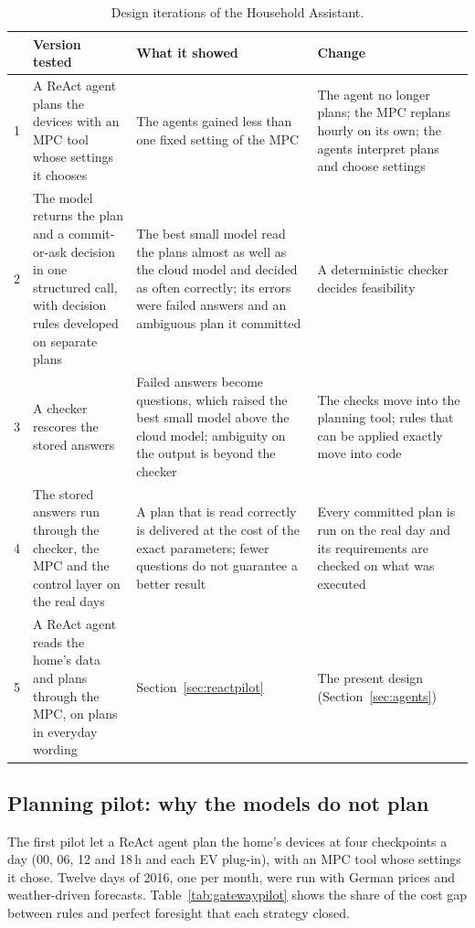 \documentclass[12pt,a4paper]{report}
\begin{document}
\begin{table}[htbp]
\caption{Design iterations of the Household Assistant.}
\label{tab:iterations}
\small
\begin{tabularx}{\textwidth}{@{}c>{\raggedright\arraybackslash}p{3.4cm}>{\raggedright\arraybackslash}X>{\raggedright\arraybackslash}X@{}}
\toprule
 & Version tested & What it showed & Change \\
\midrule
1 & A ReAct agent plans the devices with an MPC tool whose settings it chooses & The agents gained less than one fixed setting of the MPC & The agent no longer plans; the MPC replans hourly on its own; the agents interpret plans and choose settings \\[3pt]
2 & The model returns the plan and a commit-or-ask decision in one structured call, with decision rules developed on separate plans & The best small model read the plans almost as well as the cloud model and decided as often correctly; its errors were failed answers and an ambiguous plan it committed & A deterministic checker decides feasibility \\[3pt]
3 & A checker rescores the stored answers & Failed answers become questions, which raised the best small model above the cloud model; ambiguity on the output is beyond the checker & The checks move into the planning tool; rules that can be applied exactly move into code \\[3pt]
4 & The stored answers run through the checker, the MPC and the control layer on the real days & A plan that is read correctly is delivered at the cost of the exact parameters; fewer questions do not guarantee a better result & Every committed plan is run on the real day and its requirements are checked on what was executed \\[3pt]
5 & A ReAct agent reads the home's data and plans through the MPC, on plans in everyday wording & Section~\ref{sec:reactpilot} & The present design (Section~\ref{sec:agents}) \\
\bottomrule
\end{tabularx}
\end{table}

\subsection{Planning pilot: why the models do not plan}
\label{sec:gatewaypilot}

The first pilot let a ReAct agent plan the home's devices at four
checkpoints a day (00, 06, 12 and 18\,h and each EV plug-in), with an MPC tool whose
settings it chose. Twelve days of 2016, one per month, were run with
German prices and weather-driven forecasts. Table~\ref{tab:gatewaypilot}
shows the share of the cost gap between rules and perfect foresight
that each strategy closed.
\end{document}
